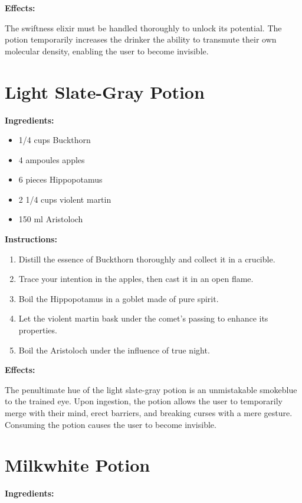 \documentclass{article}
\begin{document}
\textbf{Effects:}

The swiftness elixir must be handled thoroughly to unlock its potential. The potion temporarily increases the drinker the ability to transmute their own molecular density, enabling the user to become invisible.

\newpage
\section*{Light Slate-Gray Potion}

\textbf{Ingredients:}

\begin{itemize}
  \item 1/4 cups Buckthorn
  \item 4 ampoules apples
  \item 6 pieces Hippopotamus
  \item 2 1/4 cups violent martin
  \item 150 ml Aristoloch
\end{itemize}

\textbf{Instructions:}

\begin{enumerate}
  \item Distill the essence of Buckthorn thoroughly and collect it in a crucible.
  \item Trace your intention in the apples, then cast it in an open flame.
  \item Boil the Hippopotamus in a goblet made of pure spirit.
  \item Let the violent martin bask under the comet’s passing to enhance its properties.
  \item Boil the Aristoloch under the influence of true night.
\end{enumerate}

\textbf{Effects:}

The penultimate hue of the light slate-gray potion is an unmistakable smokeblue to the trained eye. Upon ingestion, the potion allows the user to temporarily merge with their mind, erect barriers, and breaking curses with a mere gesture. Consuming the potion causes the user to become invisible.

\newpage
\section*{Milkwhite Potion}

\textbf{Ingredients:}
\end{document}
